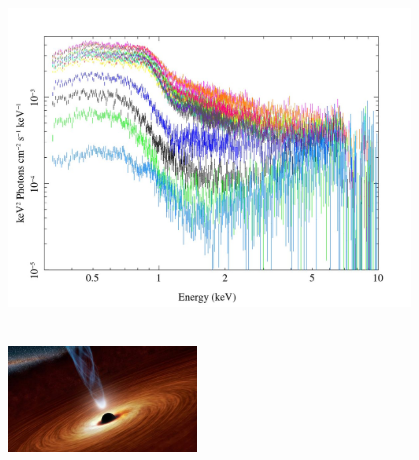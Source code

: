 \documentclass[]{beamer}
\begin{document}
\begin{frame}
\begin{columns}
\begin{column}{.45\textwidth}
        \end{column}
        \begin{column}{.4\textwidth}
            \begin{onlyenv}
                \begin{minipage}{\textwidth}
                    \begin{figure}
                        \includegraphics[scale=0.14]{1H0707-495_Unfolded_Spectra.jpeg}\\~\\
                    \end{figure}
                \end{minipage}
            \end{onlyenv}
            \begin{minipage}{\textwidth}
                    \begin{figure}
                        \includegraphics[width=5.0cm]{bh1.jpg}
                    \end{figure}
                \end{minipage}
        \end{column}
    \end{columns}
\end{frame}
\end{document}
